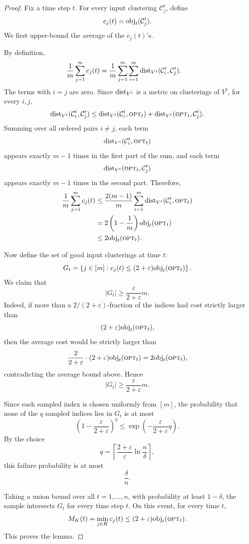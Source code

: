 \begin{proof}
Fix a time step \(t\). For every input clustering \(\mathcal C_j^t\), define
\[
    c_j(t)=\text{obj}_t(\mathcal C_j^t).
\]
We first upper-bound the average of the \(c_j(t)\)'s.

By definition,
\[
\begin{aligned}
    \frac1m\sum_{j=1}^m c_j(t)
    &=
    \frac1m
    \sum_{j=1}^m
    \sum_{i=1}^m
    \text{dist}_{V^t}(\mathcal C_i^t,\mathcal C_j^t).
\end{aligned}
\]
The terms with \(i=j\) are zero. Since \(\text{dist}_{V^t}\) is a metric on clusterings of \(V^t\), for every \(i,j\),
\[
    \text{dist}_{V^t}(\mathcal C_i^t,\mathcal C_j^t)
    \le
    \text{dist}_{V^t}(\mathcal C_i^t,\textsc{opt}_t)
    +
    \text{dist}_{V^t}(\textsc{opt}_t,\mathcal C_j^t).
\]
Summing over all ordered pairs \(i\neq j\), each term
\[
    \text{dist}_{V^t}(\mathcal C_i^t,\textsc{opt}_t)
\]
appears exactly \(m-1\) times in the first part of the sum, and each term
\[
    \text{dist}_{V^t}(\textsc{opt}_t,\mathcal C_j^t)
\]
appears exactly \(m-1\) times in the second part. Therefore,
\[
\begin{aligned}
    \frac1m\sum_{j=1}^m c_j(t)
    &\le
    \frac{2(m-1)}{m}
    \sum_{i=1}^m
    \text{dist}_{V^t}(\mathcal C_i^t,\textsc{opt}_t)\\
    &=
    2\left(1-\frac1m\right)\text{obj}_t(\textsc{opt}_t)\\
    &\le
    2\text{obj}_t(\textsc{opt}_t).
\end{aligned}
\]

Now define the set of good input clusterings at time \(t\):
\[
    G_t
    =
    \left\{
        j\in[m]:
        c_j(t)\le (2+\varepsilon)\text{obj}_t(\textsc{opt}_t)
    \right\}.
\]
We claim that
\[
    |G_t|\ge \frac{\varepsilon}{2+\varepsilon}m.
\]
Indeed, if more than a \(2/(2+\varepsilon)\)-fraction of the indices had cost strictly larger than
\[
    (2+\varepsilon)\text{obj}_t(\textsc{opt}_t),
\]
then the average cost would be strictly larger than
\[
    \frac{2}{2+\varepsilon}
    \cdot
    (2+\varepsilon)\text{obj}_t(\textsc{opt}_t)
    =
    2\text{obj}_t(\textsc{opt}_t),
\]
contradicting the average bound above. Hence
\[
    |G_t|\ge \frac{\varepsilon}{2+\varepsilon}m.
\]

Since each sampled index is chosen uniformly from \([m]\), the probability that none of the \(q\) sampled indices lies in \(G_t\) is at most
\[
    \left(1-\frac{\varepsilon}{2+\varepsilon}\right)^q
    \le
    \exp\left(
        -\frac{\varepsilon}{2+\varepsilon}q
    \right).
\]
By the choice
\[
    q
    =
    \left\lceil
        \frac{2+\varepsilon}{\varepsilon}
        \ln\frac{n}{\delta}
    \right\rceil,
\]
this failure probability is at most
\[
    \frac{\delta}{n}.
\]

Taking a union bound over all \(t=1,\ldots,n\), with probability at least \(1-\delta\), the sample intersects \(G_t\) for every time step \(t\). On this event, for every time \(t\),
\[
    M_K(t)
    =
    \min_{j\in K} c_j(t)
    \le
    (2+\varepsilon)\text{obj}_t(\textsc{opt}_t).
\]
This proves the lemma.
\end{proof}

